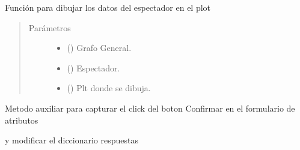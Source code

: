 \documentclass[letterpaper,10pt,spanish]{sphinxmanual}
\begin{document}
\begin{fulllineitems}
\label{\detokenize{Funciones:Funciones.dibujarDatosEspectadorAtributos}}
\sphinxAtStartPar
Función para dibujar los datos del espectador en el plot
\begin{quote}\begin{description}
\item[{Parámetros}] \leavevmode\begin{itemize}
\item {} 
\sphinxAtStartPar
{} () \textendash{} Grafo General.

\item {} 
\sphinxAtStartPar
{} ({\hyperref[\detokenize{Clases:Clases.Espectador}]{}}) \textendash{} Espectador.

\item {} 
\sphinxAtStartPar
{} () \textendash{} Plt donde se dibuja.

\end{itemize}

\end{description}\end{quote}

\end{fulllineitems}


\begin{fulllineitems}
\label{\detokenize{Funciones:Funciones.botonAtributosPersonalesClick}}
\sphinxAtStartPar
Metodo auxiliar para capturar el click del boton Confirmar en el formulario de atributos

\sphinxAtStartPar
y modificar el diccionario respuestas

\end{fulllineitems}
\end{document}
